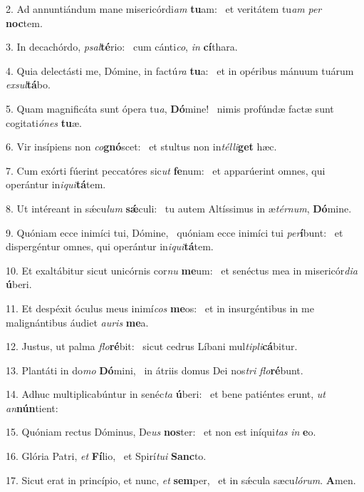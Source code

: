 2. Ad annuntiándum mane misericórdi\textit{am} \textbf{tu}am: \ast\  et veritátem tu\textit{am} \textit{per} \textbf{noc}tem.\

3. In decachórdo, \textit{psal}\textbf{té}rio: \ast\  cum cánti\textit{co}, \textit{in} \textbf{cí}thara.\

4. Quia delectásti me, Dómine, in factú\textit{ra} \textbf{tu}a: \ast\  et in opéribus mánuum tuárum \textit{ex}\textit{sul}\textbf{tá}bo.\

5. Quam magnificáta sunt ópera tu\textit{a}, \textbf{Dó}mine! \ast\  nimis profúndæ factæ sunt cogitati\textit{ó}\textit{nes} \textbf{tu}æ.\

6. Vir insípiens non \textit{co}\textbf{gnó}scet: \ast\  et stultus non in\textit{tél}\textit{li}\textbf{get} hæc.\

7. Cum exórti fúerint peccatóres sic\textit{ut} \textbf{fe}num: \ast\  et apparúerint omnes, qui operántur in\textit{i}\textit{qui}\textbf{tá}tem.\

8. Ut intéreant in sǽcu\textit{lum} \textbf{sǽ}culi: \ast\  tu autem Altíssimus in æ\textit{tér}\textit{num}, \textbf{Dó}mine.\

9. Quóniam ecce inimíci tui, Dómine, \dag\  quóniam ecce inimíci tui \textit{per}\textbf{í}bunt: \ast\  et dispergéntur omnes, qui operántur in\textit{i}\textit{qui}\textbf{tá}tem.\

10. Et exaltábitur sicut unicórnis cor\textit{nu} \textbf{me}um: \ast\  et senéctus mea in misericór\textit{di}\textit{a} \textbf{ú}beri.\

11. Et despéxit óculus meus inimí\textit{cos} \textbf{me}os: \ast\  et in insurgéntibus in me malignántibus áudiet \textit{au}\textit{ris} \textbf{me}a.\

12. Justus, ut palma \textit{flo}\textbf{ré}bit: \ast\  sicut cedrus Líbani mul\textit{ti}\textit{pli}\textbf{cá}bitur.\

13. Plantáti in do\textit{mo} \textbf{Dó}mini, \ast\  in átriis domus Dei nos\textit{tri} \textit{flo}\textbf{ré}bunt.\

14. Adhuc multiplicabúntur in senéc\textit{ta} \textbf{ú}beri: \ast\  et bene patiéntes erunt, \textit{ut} \textit{an}\textbf{nún}tient:\

15. Quóniam rectus Dóminus, De\textit{us} \textbf{nos}ter: \ast\  et non est iníqui\textit{tas} \textit{in} \textbf{e}o.\

16. Glória Patri, \textit{et} \textbf{Fí}lio, \ast\  et Spirí\textit{tu}\textit{i} \textbf{Sanc}to.\

17. Sicut erat in princípio, et nunc, \textit{et} \textbf{sem}per, \ast\  et in sǽcula sæcu\textit{ló}\textit{rum}. \textbf{A}men.\

